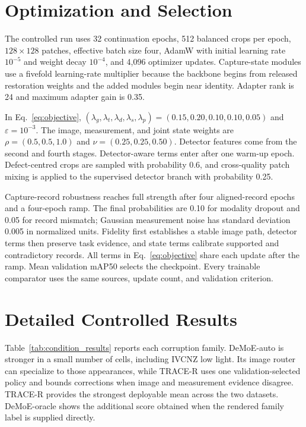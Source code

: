 \documentclass[journal]{IEEEtran}
\begin{document}


\section{Optimization and Selection}
\label{sup:training}
The controlled run uses 32 continuation epochs, 512 balanced crops per epoch, $128\times128$ patches, effective batch size four, AdamW with initial learning rate $10^{-5}$ and weight decay $10^{-4}$, and 4,096 optimizer updates. Capture-state modules use a fivefold learning-rate multiplier because the backbone begins from released restoration weights and the added modules begin near identity. Adapter rank is 24 and maximum adapter gain is 0.35.

In Eq.~\eqref{eq:objective}, $(\lambda_g,\lambda_t,\lambda_d,\lambda_s,\lambda_p)=(0.15,0.20,0.10,0.10,0.05)$ and $\varepsilon=10^{-3}$. The image, measurement, and joint state weights are $\rho=(0.5,0.5,1.0)$ and $\nu=(0.25,0.25,0.50)$. Detector features come from the second and fourth stages. Detector-aware terms enter after one warm-up epoch. Defect-centred crops are sampled with probability 0.6, and cross-quality patch mixing is applied to the supervised detector branch with probability 0.25.

Capture-record robustness reaches full strength after four aligned-record epochs and a four-epoch ramp. The final probabilities are 0.10 for modality dropout and 0.05 for record mismatch; Gaussian measurement noise has standard deviation 0.005 in normalized units. Fidelity first establishes a stable image path, detector terms then preserve task evidence, and state terms calibrate supported and contradictory records. All terms in Eq.~\eqref{eq:objective} share each update after the ramp. Mean validation mAP50 selects the checkpoint. Every trainable comparator uses the same sources, update count, and validation criterion.

\section{Detailed Controlled Results}
\label{sup:detailed}
Table~\ref{tab:condition_results} reports each corruption family. DeMoE-auto is stronger in a small number of cells, including IVCNZ low light. Its image router can specialize to those appearances, while TRACE-R uses one validation-selected policy and bounds corrections when image and measurement evidence disagree. TRACE-R provides the strongest deployable mean across the two datasets. DeMoE-oracle shows the additional score obtained when the rendered family label is supplied directly.
\end{document}
